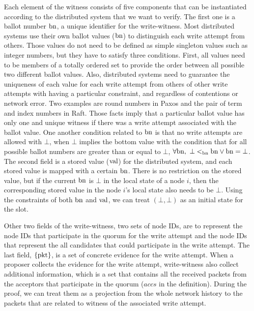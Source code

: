 Each element of the witness consists of five components that can be instantiated according to the distributed system that we want to verify.
The first one is a ballot number $\mathrm{bn}$, a unique identifier for the write-witness.
Most distributed systems use their own ballot values ($\mathrm{bn}$) to distinguish each write attempt from others. 
Those values do not need to be defined as simple singleton values such as integer numbers, but they have to satisfy three conditions. 
First, all values need to be members of a totally ordered set to provide the order 
between all possible two different ballot values.
Also, distributed systems need to guarantee the uniqueness of each value for each write attempt from others of other write attempts
with having a particular constraint, and regardless of contentions or network error.
Two examples are round numbers in Paxos and the pair of term and index numbers in Raft.
Those facts imply that a particular ballot value has only one and unique witness if there was a write attempt associated with the ballot value.
One another condition related to $\mathrm{bn}$ is that no write attempts are allowed with $\bot$, 
when $\bot$ implies the bottom value with the condition that for all possible ballot numbers are greater than or equal to $\bot$, 
 $\forall \mathrm{bn}, \ \bot <_{\mathrm{bn}} \mathrm{bn} \vee \mathrm{bn} = \bot$.
The second field is a stored value ($\mathrm{val}$) for the distributed system, and each stored value is mapped with a certain $\mathrm{bn}$.
There is no restriction on the stored value, but if the current $\mathrm{bn}$ is $\bot$ in the local state of a node $i$, 
 then the corresponding stored value in the node $i$'s local state also needs to be $\bot$.
Using the constraints of both $\mathrm{bn}$ and $\mathrm{val}$, we can treat $(\bot, \bot)$ as an initial state for the slot. 

Other two fields of the write-witness, two sets of node IDs, are to 
represent the node IDs that participate in the quorum for the write attempt and
the node IDs that represent the all candidates that could participate in the write attempt.
The last field, $\{\mathrm{pkt}\}$, is a set of concrete evidence for the write attempt. 
When a proposer collects the evidence for the write attempt, 
write-witness also collect additional information, which is a set that contains all the received packets from the acceptors that participate in the quorum ($accs$ in the definition).
During the proof, we can treat them as a projection from the whole network history to the packets that are related to witness of the associated write attempt. 


